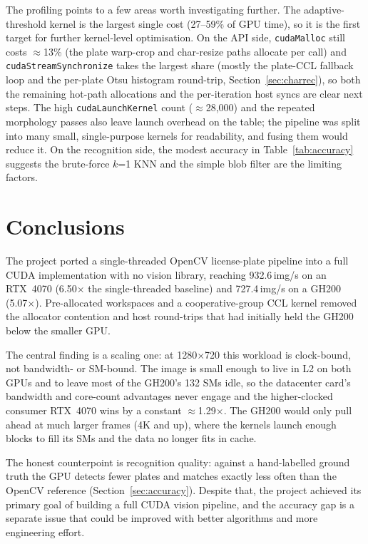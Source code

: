 The profiling points to a few areas worth investigating further.
The adaptive-threshold kernel is the largest single cost (27--59\% of GPU time), so it is the first target for further kernel-level optimisation.
On the API side, \texttt{cudaMalloc} still costs $\approx$13\% (the plate warp-crop and char-resize paths allocate per call) and \texttt{cudaStreamSynchronize} takes the largest share (mostly the plate-CCL fallback loop and the per-plate Otsu histogram round-trip, Section~\ref{sec:charrec}), so both the remaining hot-path allocations and the per-iteration host syncs are clear next steps.
The high \texttt{cudaLaunchKernel} count ($\approx$28,000) and the repeated morphology passes also leave launch overhead on the table; the pipeline was split into many small, single-purpose kernels for readability, and fusing them would reduce it.
On the recognition side, the modest accuracy in Table~\ref{tab:accuracy} suggests the brute-force $k$=1 KNN and the simple blob filter are the limiting factors.

\section{Conclusions}
\label{sec:conclusions}

The project ported a single-threaded OpenCV license-plate pipeline into a full CUDA implementation with no vision library, reaching 932.6\,img/s on an RTX~4070 (6.50$\times$ the single-threaded baseline) and 727.4\,img/s on a GH200 (5.07$\times$).
Pre-allocated workspaces and a cooperative-group CCL kernel removed the allocator contention and host round-trips that had initially held the GH200 below the smaller GPU.

The central finding is a scaling one: at 1280$\times$720 this workload is clock-bound, not bandwidth- or SM-bound.
The image is small enough to live in L2 on both GPUs and to leave most of the GH200's 132 SMs idle, so the datacenter card's bandwidth and core-count advantages never engage and the higher-clocked consumer RTX~4070 wins by a constant $\approx$1.29$\times$.
The GH200 would only pull ahead at much larger frames (4K and up), where the kernels launch enough blocks to fill its SMs and the data no longer fits in cache.

The honest counterpoint is recognition quality: against a hand-labelled ground truth the GPU detects fewer plates and matches exactly less often than the OpenCV reference (Section~\ref{sec:accuracy}). Despite that, the project achieved its primary goal of building a full CUDA vision pipeline, and the accuracy gap is a separate issue that could be improved with better algorithms and more engineering effort.

